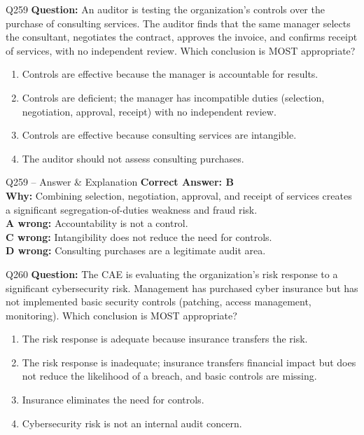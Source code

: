 \documentclass[aspectratio=169,10pt]{beamer}
\begin{document}
	\begin{frame}[t]{Q259}
		\small
		\textbf{Question:} An auditor is testing the organization's controls over the purchase of consulting services. The auditor finds that the same manager selects the consultant, negotiates the contract, approves the invoice, and confirms receipt of services, with no independent review. Which conclusion is MOST appropriate?
		\begin{enumerate}[label=\Alph*.,itemsep=1pt,topsep=2pt]
			\item Controls are effective because the manager is accountable for results.
			\item Controls are deficient; the manager has incompatible duties (selection, negotiation, approval, receipt) with no independent review.
			\item Controls are effective because consulting services are intangible.
			\item The auditor should not assess consulting purchases.
		\end{enumerate}
	\end{frame}
	
	\begin{frame}[t]{Q259 -- Answer \& Explanation}
		\small
		\textbf{Correct Answer: B} \\[4pt]
		\textbf{Why:} Combining selection, negotiation, approval, and receipt of services creates a significant segregation-of-duties weakness and fraud risk. \\[4pt]
		\textbf{A wrong:} Accountability is not a control. \\[2pt]
		\textbf{C wrong:} Intangibility does not reduce the need for controls. \\[2pt]
		\textbf{D wrong:} Consulting purchases are a legitimate audit area.
	\end{frame}
	
	\begin{frame}[t]{Q260}
		\small
		\textbf{Question:} The CAE is evaluating the organization's risk response to a significant cybersecurity risk. Management has purchased cyber insurance but has not implemented basic security controls (patching, access management, monitoring). Which conclusion is MOST appropriate?
		\begin{enumerate}[label=\Alph*.,itemsep=1pt,topsep=2pt]
			\item The risk response is adequate because insurance transfers the risk.
			\item The risk response is inadequate; insurance transfers financial impact but does not reduce the likelihood of a breach, and basic controls are missing.
			\item Insurance eliminates the need for controls.
			\item Cybersecurity risk is not an internal audit concern.
		\end{enumerate}
	\end{frame}
	
\end{document}
